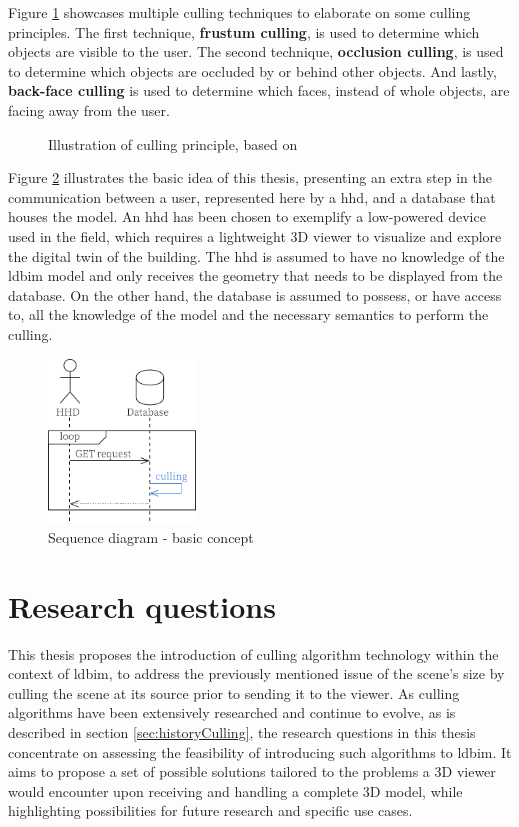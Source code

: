 Figure \ref{fig:cullingPrinciple} showcases multiple culling techniques to elaborate on some culling principles. The first technique, \textbf{frustum culling}, is used to determine which objects are visible to the user. The second technique, \textbf{occlusion culling}, is used to determine which objects are occluded by or behind other objects. And lastly, \textbf{back-face culling} is used to determine which faces, instead of whole objects, are facing away from the user.

\begin{figure}[h]
	\centering
	
	\caption[Illustration of culling principle]{Illustration of culling principle, based on \cite{CullingPrinciples}}
	\label{fig:cullingPrinciple}
\end{figure}

Figure \ref{fig:firstIdea} illustrates the basic idea of this thesis, presenting an extra step in the communication between a user, represented here by a \ac{hhd}, and a database that houses the model. An \ac{hhd} has been chosen to exemplify a low-powered device used in the field, which requires a lightweight 3D viewer to visualize and explore the digital twin of the building. The \ac{hhd} is assumed to have no knowledge of the \ac{ldbim} model and only receives the geometry that needs to be displayed from the database. On the other hand, the database is assumed to possess, or have access to, all the knowledge of the model and the necessary semantics to perform the culling.

\begin{figure}[H]
	\centering
	\includegraphics[width=0.35\textwidth]{figures/pdf/first idea.pdf}
	\caption{Sequence diagram - basic concept}
	\label{fig:firstIdea}
\end{figure}


\section{Research questions}\label{sec:researchQuestions}
This thesis proposes the introduction of culling algorithm technology within the context of \ac{ldbim}, to address the previously mentioned issue of the scene's size by culling the scene at its source prior to sending it to the viewer. As culling algorithms have been extensively researched and continue to evolve, as is described in section \ref{sec:historyCulling}, the research questions in this thesis concentrate on assessing the feasibility of introducing such algorithms to \ac{ldbim}. It aims to propose a set of possible solutions tailored to the problems a 3D viewer would encounter upon receiving and handling a complete 3D model, while highlighting possibilities for future research and specific use cases.

